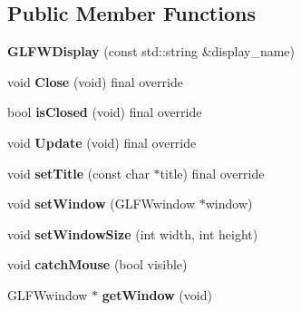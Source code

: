 \subsection*{Public Member Functions}
\begin{DoxyCompactItemize}
\item 
\hypertarget{classEngine_1_1GLFWDisplay_a11e7737d66dce9a3fef33f1f5a1b27d1}{}{\bfseries G\+L\+F\+W\+Display} (const std\+::string \&display\+\_\+name)\label{classEngine_1_1GLFWDisplay_a11e7737d66dce9a3fef33f1f5a1b27d1}

\item 
\hypertarget{classEngine_1_1GLFWDisplay_a5a53cf7631695c18aae7c3c3c37d7c5c}{}void {\bfseries Close} (void) final override\label{classEngine_1_1GLFWDisplay_a5a53cf7631695c18aae7c3c3c37d7c5c}

\item 
\hypertarget{classEngine_1_1GLFWDisplay_a138fce031afc06d204121da1ed3c38dd}{}bool {\bfseries is\+Closed} (void) final override\label{classEngine_1_1GLFWDisplay_a138fce031afc06d204121da1ed3c38dd}

\item 
\hypertarget{classEngine_1_1GLFWDisplay_ac2e1863cd5500dfc43199c25a49a2e1d}{}void {\bfseries Update} (void) final override\label{classEngine_1_1GLFWDisplay_ac2e1863cd5500dfc43199c25a49a2e1d}

\item 
\hypertarget{classEngine_1_1GLFWDisplay_acef361f485ccbba0a7347f675b58c09a}{}void {\bfseries set\+Title} (const char $\ast$title) final override\label{classEngine_1_1GLFWDisplay_acef361f485ccbba0a7347f675b58c09a}

\item 
\hypertarget{classEngine_1_1GLFWDisplay_aee19c00f6e759b8f841b946af479221f}{}void {\bfseries set\+Window} (G\+L\+F\+Wwindow $\ast$window)\label{classEngine_1_1GLFWDisplay_aee19c00f6e759b8f841b946af479221f}

\item 
\hypertarget{classEngine_1_1GLFWDisplay_adb15f8359bdfc47eb50efca684b50736}{}void {\bfseries set\+Window\+Size} (int width, int height)\label{classEngine_1_1GLFWDisplay_adb15f8359bdfc47eb50efca684b50736}

\item 
\hypertarget{classEngine_1_1GLFWDisplay_a2e38e41b57d87995372ecbe01211dc52}{}void {\bfseries catch\+Mouse} (bool visible)\label{classEngine_1_1GLFWDisplay_a2e38e41b57d87995372ecbe01211dc52}

\item 
\hypertarget{classEngine_1_1GLFWDisplay_a5b613b17c2aa0537158d57746c0f4d43}{}G\+L\+F\+Wwindow $\ast$ {\bfseries get\+Window} (void)\label{classEngine_1_1GLFWDisplay_a5b613b17c2aa0537158d57746c0f4d43}

\end{DoxyCompactItemize}
